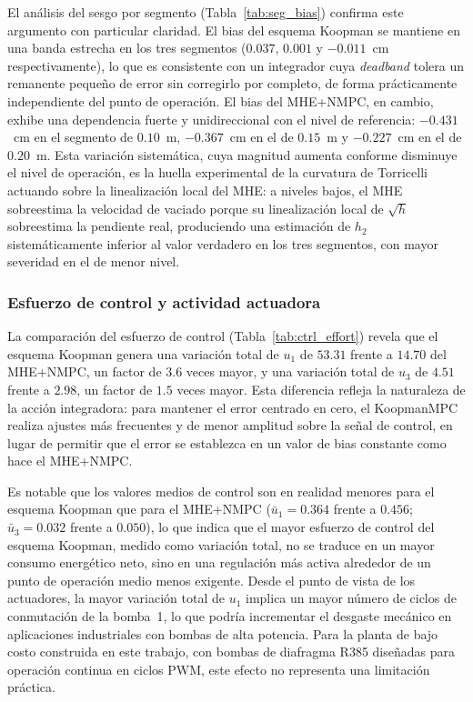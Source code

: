 \documentclass[12pt,letterpaper]{article}
\begin{document}
El análisis del sesgo por segmento (Tabla~\ref{tab:seg_bias}) 
confirma este argumento con particular claridad. El bias del 
esquema Koopman se mantiene en una banda estrecha en los tres 
segmentos ($0.037$, $0.001$ y $-0.011$~cm respectivamente), lo 
que es consistente con un integrador cuya \textit{deadband} 
tolera un remanente pequeño de error sin corregirlo por completo, 
de forma prácticamente independiente del punto de operación. El 
bias del MHE+NMPC, en cambio, exhibe una dependencia fuerte y 
unidireccional con el nivel de referencia: $-0.431$~cm en el 
segmento de $0.10$~m, $-0.367$~cm en el de $0.15$~m y $-0.227$~cm 
en el de $0.20$~m. Esta variación sistemática, cuya magnitud 
aumenta conforme disminuye el nivel de operación, es la huella 
experimental de la curvatura de Torricelli actuando sobre la 
linealización local del MHE: a niveles bajos, el MHE sobreestima 
la velocidad de vaciado porque su linealización local de 
$\sqrt{h}$ sobreestima la pendiente real, produciendo una 
estimación de $h_2$ sistemáticamente inferior al valor verdadero 
en los tres segmentos, con mayor severidad en el de menor nivel.

\subsubsection{Esfuerzo de control y actividad actuadora}
\label{sec:analisis_exp_ctrl}

La comparación del esfuerzo de control (Tabla~\ref{tab:ctrl_effort}) 
revela que el esquema Koopman genera una variación total de $u_1$ 
de $53.31$ frente a $14.70$ del MHE+NMPC, un factor de $3.6$ veces 
mayor, y una variación total de $u_3$ de $4.51$ frente a $2.98$, 
un factor de $1.5$ veces mayor. Esta diferencia refleja la 
naturaleza de la acción integradora: para mantener el error 
centrado en cero, el KoopmanMPC realiza ajustes más frecuentes y 
de menor amplitud sobre la señal de control, en lugar de permitir 
que el error se establezca en un valor de bias constante como hace 
el MHE+NMPC. 

Es notable que los valores medios de control son en realidad 
menores para el esquema Koopman que para el MHE+NMPC 
($\bar{u}_1 = 0.364$ frente a $0.456$; $\bar{u}_3 = 0.032$ frente 
a $0.050$), lo que indica que el mayor esfuerzo de control del 
esquema Koopman, medido como variación total, no se traduce en un 
mayor consumo energético neto, sino en una regulación más activa 
alrededor de un punto de operación medio menos exigente. Desde el 
punto de vista de los actuadores, la mayor variación total de $u_1$ 
implica un mayor número de ciclos de conmutación de la bomba~1, lo 
que podría incrementar el desgaste mecánico en aplicaciones 
industriales con bombas de alta potencia. Para la planta de bajo 
costo construida en este trabajo, con bombas de diafragma R385 
diseñadas para operación continua en ciclos PWM, este efecto no 
representa una limitación práctica.
\end{document}
